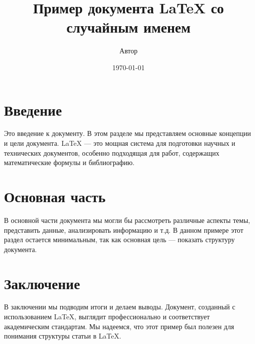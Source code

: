 \documentclass{article}
\title{Пример документа LaTeX со случайным именем}
\author{Автор}
\date{\today}
\begin{document}
\maketitle

\section{Введение}
Это введение к документу. В этом разделе мы представляем основные концепции и цели документа. LaTeX --- это мощная система для подготовки научных и технических документов, особенно подходящая для работ, содержащих математические формулы и библиографию.

\section{Основная часть}
В основной части документа мы могли бы рассмотреть различные аспекты темы, представить данные, анализировать информацию и т.д. В данном примере этот раздел остается минимальным, так как основная цель --- показать структуру документа.

\section{Заключение}
В заключении мы подводим итоги и делаем выводы. Документ, созданный с использованием LaTeX, выглядит профессионально и соответствует академическим стандартам. Мы надеемся, что этот пример был полезен для понимания структуры статьи в LaTeX.
\end{document}
